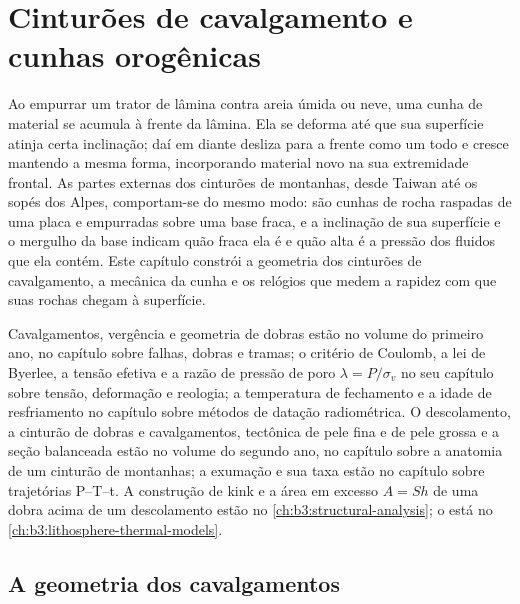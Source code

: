 \chapter{Cinturões de cavalgamento e cunhas orogênicas}\label{ch:b3:orogenic-wedges}

Ao empurrar um trator de lâmina contra areia úmida ou neve, uma cunha de material se acumula
à frente da lâmina. Ela se deforma até que sua superfície atinja certa inclinação;
daí em diante desliza para a frente como um todo e cresce mantendo a mesma forma,
incorporando material novo na sua extremidade frontal. As partes externas dos cinturões de montanhas, desde
Taiwan até os sopés dos Alpes, comportam-se do mesmo modo: são cunhas de rocha
raspadas de uma placa e empurradas sobre uma base fraca, e a inclinação de sua superfície
e o mergulho da base indicam quão fraca ela é e quão alta é a
pressão dos fluidos que ela contém. Este capítulo constrói a geometria dos
cinturões de cavalgamento, a mecânica da cunha e os relógios que medem a rapidez com que suas
rochas chegam à superfície.

\begin{recall}
Cavalgamentos, vergência e geometria de dobras estão no volume do primeiro ano, no capítulo
sobre falhas, dobras e tramas; o critério de Coulomb, a lei de Byerlee, a
tensão efetiva e a razão de pressão de poro $\lambda = P/\sigma_v$ no seu
capítulo sobre tensão, deformação e reologia; a temperatura de fechamento e a idade de resfriamento
no capítulo sobre métodos de datação radiométrica. O descolamento, a
cinturão de dobras e cavalgamentos, tectônica de pele fina e de pele grossa e a seção balanceada
estão no volume do segundo ano, no capítulo sobre a anatomia de um
cinturão de montanhas; a exumação e sua taxa estão no capítulo sobre trajetórias P--T--t. A
construção de kink e a área em excesso $A = Sh$ de uma dobra acima de um descolamento
estão no \cref{ch:b3:structural-analysis}; o  está
no \cref{ch:b3:lithosphere-thermal-models}.
\end{recall}

\section{A geometria dos cavalgamentos}\label{sec:b3:orogenic-wedges:geometry}

